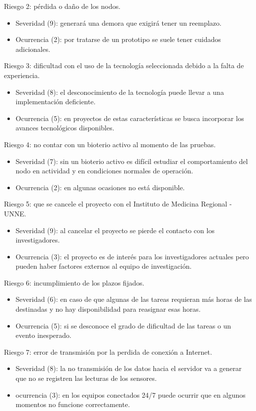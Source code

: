 \documentclass[
11pt, %
]{charter}
\begin{document}
Riesgo 2: pérdida o daño de los nodos.
\begin{itemize}
	\item Severidad (9): generará una demora  que exigirá tener un reemplazo.
	\item Ocurrencia (2): por tratarse de un prototipo se suele tener cuidados adicionales.
\end{itemize}

Riesgo 3: dificultad con el uso de la tecnología seleccionada debido a la falta de experiencia.
\begin{itemize}
	\item Severidad (8): el desconocimiento de la tecnología puede llevar a una implementación deficiente.
	\item Ocurrencia (5): en proyectos de estas características se busca incorporar los avances tecnológicos disponibles.
\end{itemize}

Riesgo 4: no contar con un bioterio activo al momento de las pruebas.
\begin{itemize}
	\item Severidad (7): sin un bioterio activo es difícil estudiar el comportamiento del nodo en actividad y en condiciones normales de operación.
	\item Ocurrencia (2): en algunas ocasiones no está disponible.
\end{itemize}

Riesgo 5: que se cancele el proyecto con el Instituto de Medicina Regional - UNNE.
\begin{itemize}
	\item Severidad (9): al cancelar el proyecto se pierde el contacto con los investigadores.
	\item Ocurrencia (3): el proyecto es de interés para los investigadores actuales pero pueden haber factores externos al equipo de investigación.
\end{itemize}

Riesgo 6: incumplimiento de los plazos fijados.
\begin{itemize}
	\item Severidad (6): en caso de que algunas de las tareas requieran más horas de las destinadas y no hay disponibilidad para reasignar esas horas.
	\item Ocurrencia (5): si se desconoce el grado de dificultad de las tareas o un evento inesperado.
\end{itemize}

Riesgo 7: error de transmisión por la perdida de conexión a Internet.
\begin{itemize}
	\item Severidad (8): la no transmisión de los datos hacia el servidor va a generar que no se registren las lecturas de los sensores.
	\item ocurrencia (3): en los equipos conectados 24/7 puede ocurrir que en algunos momentos no funcione correctamente.
\end{itemize}
\end{document}
